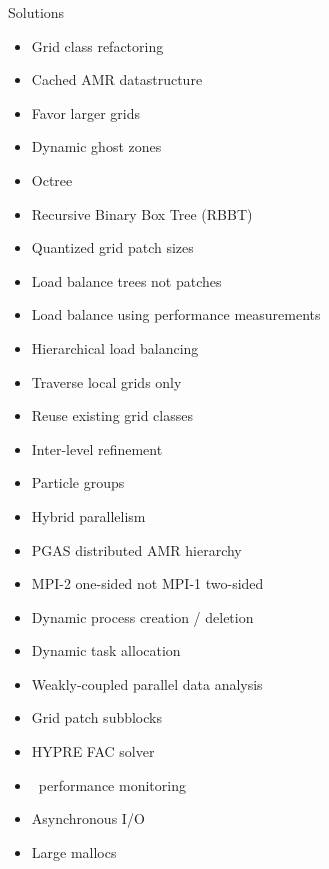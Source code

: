 \documentclass{article}
\begin{document}
Solutions
\begin{itemize}
\item Grid class refactoring 
\item Cached AMR datastructure  
\item Favor larger grids  
\item Dynamic ghost zones  
\item Octree  
\item Recursive Binary Box Tree (RBBT)  
\item Quantized grid patch sizes  
\item Load balance trees not patches  
\item Load balance using performance measurements  
\item Hierarchical load balancing  
\item Traverse local grids only  
\item Reuse existing grid classes  
\item Inter-level refinement  

\item Particle groups  

\item Hybrid parallelism 
\item PGAS distributed AMR hierarchy  
\item MPI-2 one-sided not MPI-1 two-sided  
\item Dynamic process creation / deletion  
\item Dynamic task allocation  
\item Weakly-coupled parallel data analysis  
\item Grid patch subblocks  

\item HYPRE FAC solver  

\item \lcaperf\ performance monitoring  

\item Asynchronous I/O  

\item Large mallocs  

\end{itemize}
\end{document}
